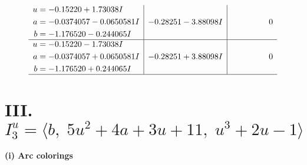 \documentclass[1p]{elsarticle_modified}
\theoremstyle{definition}
\begin{document}
$$\begin{array}{c|c|c}
\begin{aligned}
u &= -0.15220 + 1.73038 I \\
a &= -0.0374057 - 0.0650581 I \\
b &= -1.176520 - 0.244065 I\end{aligned}
 & -0.28251 - 3.88098 I & \phantom{-0.000000 } 0 \\ \hline\begin{aligned}
u &= -0.15220 - 1.73038 I \\
a &= -0.0374057 + 0.0650581 I \\
b &= -1.176520 + 0.244065 I\end{aligned}
 & -0.28251 + 3.88098 I & \phantom{-0.000000 } 0\\
 \hline 
 \end{array}$$\newpage\newpage\renewcommand{\arraystretch}{1}
\centering \section*{III. $I^u_{3}= \langle b,\;5 u^2+4 a+3 u+11,\;u^3+2 u-1 \rangle$}
\flushleft \textbf{(i) Arc colorings}\\
\end{document}
